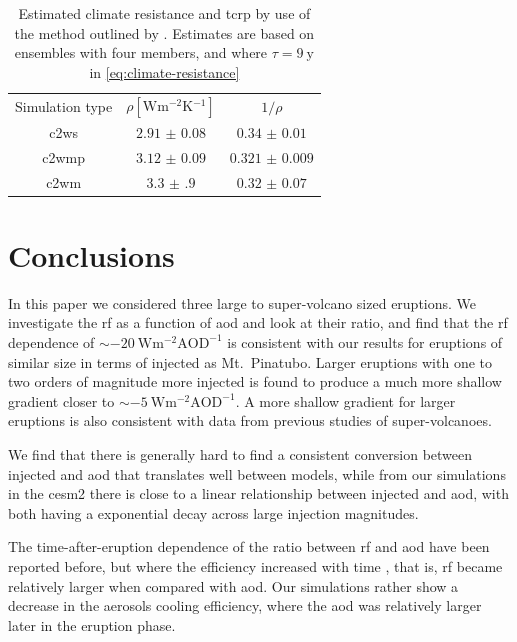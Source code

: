\documentclass{ametsocV5}
\newcommand{\iso}[1][i]{{#1}njected \ce{SO2}}
\begin{document}
\begin{table}
  \centering

  \caption{Estimated climate resistance and \ac{tcrp} by use of the method outlined by
    \citet{merlis2014}. Estimates are based on ensembles with four members, and where \(\tau
    =\SI{9}{\mathrm{y}}\) in \cref{eq:climate-resistance}}\label{tab:trcp}%
  \begin{tabular}{ccc}
    Simulation type & \(\rho [\si{\watt\metre^{-2}\kelvin^{-1}}]\) & \(1/\rho\)         \\
    \ac{c2ws}       & \(\num{2.91(8)}\)                            & \(\num{0.34(1)}\)  \\
    \ac{c2wmp}      & \(\num{3.12(9)}\)                            & \(\num{0.321(9)}\) \\
    \ac{c2wm}       & \(\num{3.3(9)}\)                             & \(\num{0.32(7)}\)  \\
  \end{tabular}
\end{table}

\section{Conclusions}


In this paper we considered three large to super-volcano sized eruptions. We investigate
the \ac{rf} as a function of \ac{aod} and look at their ratio, and find that the \ac{rf}
dependence of \(\sim\SI{-20}{\watt\metre^{-2}\mathrm{AOD}^{-1}}\) is consistent with our
results for eruptions of similar size in terms of \iso{} as Mt.\ Pinatubo. Larger
eruptions with one to two orders of magnitude more \iso{} is found to produce a much
more shallow gradient closer to \(\sim \SI{-5}{\watt\metre^{-2}\mathrm{AOD}^{-1}}\). A
more shallow gradient for larger eruptions is also consistent with data from previous
studies of super-volcanoes.

We find that there is generally hard to find a consistent conversion between \iso{} and
\ac{aod} that translates well between models, while from our simulations in the
\ac{cesm2} there is close to a linear relationship between \iso{} and \ac{aod}, with
both having a exponential decay across large injection magnitudes.

The time-after-eruption dependence of the ratio between \ac{rf} and \ac{aod} have been
reported before, but where the efficiency increased with time \citep{marshall2020}, that
is, \ac{rf} became relatively larger when compared with \ac{aod}. Our simulations rather
show a decrease in the aerosols cooling efficiency, where the \ac{aod} was relatively
larger later in the eruption phase.
\end{document}
